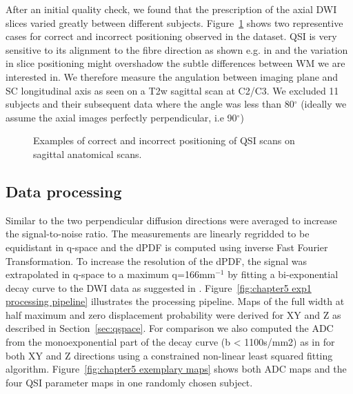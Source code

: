 After an initial quality check, we found that the prescription of the axial \gls{DWI} slices varied greatly between different subjects. Figure~\ref{fig:chapter5 positioning} shows two representive cases for correct and incorrect positioning observed in the dataset. \gls{QSI} is very sensitive to its alignment to the fibre direction as shown e.g. in \citep{Avram:2004} and the variation in slice positioning might overshadow the subtle differences between \gls{WM} we are interested in. We therefore measure the angulation between imaging plane and \gls{SC} longitudinal axis as seen on a T2w sagittal scan at C2/C3. We excluded 11 subjects and their subsequent data where the angle was less than 80$^\circ$ (ideally we assume the axial images perfectly perpendicular, i.e 90$^\circ$)

\begin{figure}
\centering
{}\hspace{0.015\textwidth}
\caption{Examples of correct and incorrect positioning of QSI scans on sagittal anatomical scans.}
\label{fig:chapter5 positioning}
\end{figure}

\subsection{Data processing}
Similar to \citet{Farrell:2008} the two perpendicular diffusion directions were averaged to increase the signal-to-noise ratio. The measurements are linearly regridded to be equidistant in q-space and the  {\gls{dPDF}} is computed using inverse Fast Fourier Transformation. To increase the resolution of the  {\gls{dPDF}}, the signal was extrapolated in q-space to a maximum q=166mm$^{-1}$ by fitting a bi-exponential decay curve to the {\gls{DWI}} data as suggested in \citet{Cohen:2002, Farrell:2008}. Figure~\ref{fig:chapter5 exp1 processing pipeline} illustrates the processing pipeline. Maps of the full width at half maximum and zero displacement probability were derived for XY and Z as described in Section~\ref{sec:qspace}. For comparison we also computed the \gls{ADC} from the monoexponential part of the decay curve (b < 1100s/mm2) as in \citet{Farrell:2008} for both XY and Z directions using a constrained non-linear least squared fitting algorithm. Figure~\ref{fig:chapter5 exemplary maps} shows both \gls{ADC} maps and the four \gls{QSI} parameter maps in one randomly chosen subject.


